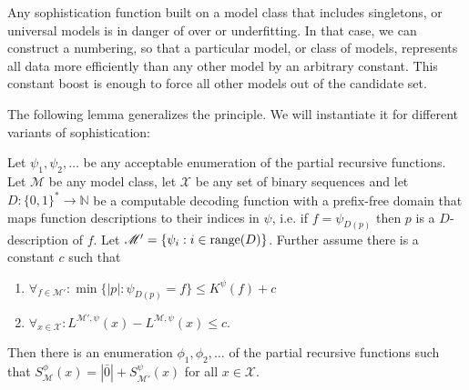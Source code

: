 \documentclass{style/llncs}
\newcommand{\M}{\mathscr M}
\newcommand{\X}{\mathscr X}
\newcommand{\N}{\mathbb N}
\newcommand{\tn}[1]{\textnormal{#1}}
\begin{document}
Any sophistication function built on a model class that includes singletons, or universal models is in danger of over or underfitting. In that case, we can construct a numbering, so that a particular model, or class of models, represents all data more efficiently than any other model by an arbitrary constant. This constant boost is enough to force all other models out of the candidate set. 

The following lemma generalizes the principle. We will instantiate it for different variants of sophistication: 

\begin{lemma}\label{lemma:thecoolone}
  Let $\psi_1,\psi_2,\ldots$ be any acceptable enumeration of the partial recursive functions.
  Let $\M$ be any model class, let $\X$ be any set of binary sequences and let $D:\{0,1\}^*\to\N$ be a computable decoding function with a prefix-free domain that maps function descriptions to their indices in $\psi$, i.e. if $f=\psi_{D(p)}$ then $p$ is a $D$-description of $f$. Let $\M'=\{\psi_i:i\in\tn{range}(D)\}$. Further assume there is a constant $c$ such that
\begin{enumerate}
  \item $\forall_{f\in\M'}:\min\{|p|:\psi_{D(p)}=f\}\le K^\psi(f)+c$
  \item $\forall_{x\in\X}:L^{\M',\psi}(x)-L^{\M,\psi}(x)\le c$.
\end{enumerate}
Then there is an enumeration $\phi_1,\phi_2,\ldots$ of the partial recursive functions such that $S^\phi_{\M}(x) = |\bar 0|+S^\psi_{\M'}(x)$ for all $x\in\X$.
\end{lemma}
\end{document}
